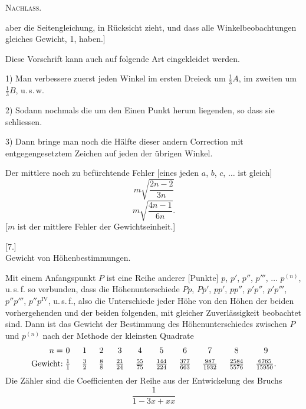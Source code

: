 \clearpage
{}\hfill\textsc{Nachlass.}\hfill\mbox{}\par\medskip
\noindent aber die Seitengleichung, in Rücksicht zieht, und dass alle Winkelbeobachtungen gleiches Gewicht, 1, haben.]

Diese Vorschrift kann auch auf folgende Art eingekleidet werden.

1) Man verbessere zuerst jeden Winkel im ersten Dreieck um $\frac13A$, im zweiten um $\frac13B$, u.\,s.\,w.

2) Sodann nochmals die um den Einen Punkt herum liegenden, so dass sie schliessen.

3) Dann bringe man noch die Hälfte dieser andern Correction mit entgegengesetztem Zeichen auf jeden der übrigen Winkel.

Der mittlere noch zu befürchtende Fehler [eines jeden $a$, $b$, $c$, $\ldots$ ist gleich]
\[
m\sqrt{\frac{2n-2}{3n}}
\]
\[
m\sqrt{\frac{4n-1}{6n}}.
\]
[$m$ ist der mittlere Fehler der Gewichtseinheit.]
\bigskip
\begin{center}[7.]\\[5pt]Gewicht von Höhenbestimmungen.\end{center}
Mit einem Anfangspunkt $P$ ist eine Reihe anderer [Punkte] $p$, $p'$, $p''$, $p'''$, $\ldots$ $p^{(n)}$, u.\,s.\,f. so verbunden, dass die Höhenunterschiede $Pp$, $Pp'$, $pp'$, $pp''$, $p'p''$, $p'p'''$, $p''p'''$, $p''p^{\mathrm{IV}}$, u.\,s.\,f., also die Unterschiede jeder Höhe von den Höhen der beiden vorhergehenden und der beiden folgenden, mit gleicher Zuverlässigkeit beobachtet sind. Dann ist das Gewicht der Bestimmung des Höhenunterschiedes zwischen $P$ und $p^{(n)}$ nach der Methode der kleinsten Quadrate
\[
\setlength{\arraycolsep}{7pt}
\begin{array}{r@{\;}cccccccccc}
n=&0&1&2&3&4&5&6&7&8&9\\[4pt]
\text{Gewicht:}&\frac11&\frac32&\frac88&\frac{21}{24}&\frac{55}{75}&\frac{144}{224}&\frac{377}{663}&\frac{987}{1932}&\frac{2584}{5576}&\frac{6765}{15950}.
\end{array}
\]
Die Zähler sind die Coefficienten der Reihe aus der Entwickelung des Bruchs
\[
\frac1{1-3x+xx}
\]

